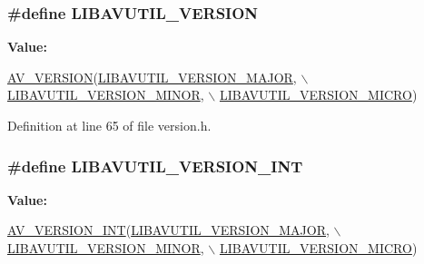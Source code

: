 \subsubsection[{\texorpdfstring{L\+I\+B\+A\+V\+U\+T\+I\+L\+\_\+\+V\+E\+R\+S\+I\+ON}{LIBAVUTIL_VERSION}}]{\setlength{\rightskip}{0pt plus 5cm}\#define L\+I\+B\+A\+V\+U\+T\+I\+L\+\_\+\+V\+E\+R\+S\+I\+ON}\hypertarget{group__lavu__ver_gaee2664f9bb9d1285534db2a40f6fa8af}{}\label{group__lavu__ver_gaee2664f9bb9d1285534db2a40f6fa8af}
{\bfseries Value\+:}
\begin{DoxyCode}
\hyperlink{group__version__utils_ga544629c436701faf48e33d650ace1289}{AV\_VERSION}(\hyperlink{group__lavu__ver_gaa29a3ad3376b8050d9ef4779045f745e}{LIBAVUTIL\_VERSION\_MAJOR},     \(\backslash\)
                                           \hyperlink{group__lavu__ver_ga9848c90e4ea707cb0732db0de569452a}{LIBAVUTIL\_VERSION\_MINOR},     \(\backslash\)
                                           \hyperlink{group__lavu__ver_gad5484c7f1208de134ba538874d2c04fd}{LIBAVUTIL\_VERSION\_MICRO})
\end{DoxyCode}


Definition at line 65 of file version.\+h.

\subsubsection[{\texorpdfstring{L\+I\+B\+A\+V\+U\+T\+I\+L\+\_\+\+V\+E\+R\+S\+I\+O\+N\+\_\+\+I\+NT}{LIBAVUTIL_VERSION_INT}}]{\setlength{\rightskip}{0pt plus 5cm}\#define L\+I\+B\+A\+V\+U\+T\+I\+L\+\_\+\+V\+E\+R\+S\+I\+O\+N\+\_\+\+I\+NT}\hypertarget{group__lavu__ver_ga36e17e3fc9bcbe5c55820a8ac8b47e3c}{}\label{group__lavu__ver_ga36e17e3fc9bcbe5c55820a8ac8b47e3c}
{\bfseries Value\+:}
\begin{DoxyCode}
\hyperlink{group__version__utils_gaaab323b60e1a6e38ec939efe881474c7}{AV\_VERSION\_INT}(\hyperlink{group__lavu__ver_gaa29a3ad3376b8050d9ef4779045f745e}{LIBAVUTIL\_VERSION\_MAJOR}, \(\backslash\)
                                               \hyperlink{group__lavu__ver_ga9848c90e4ea707cb0732db0de569452a}{LIBAVUTIL\_VERSION\_MINOR}, \(\backslash\)
                                               \hyperlink{group__lavu__ver_gad5484c7f1208de134ba538874d2c04fd}{LIBAVUTIL\_VERSION\_MICRO})
\end{DoxyCode}


